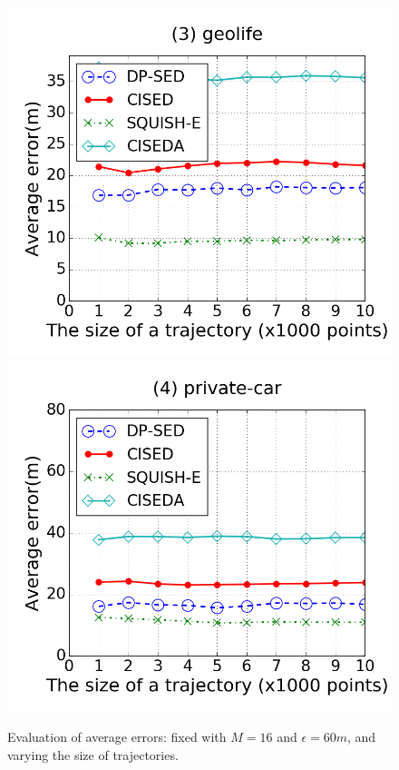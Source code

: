 \begin{figure}[tb!]
\includegraphics[scale = 0.250]{figures/Exp-error-size-geolife.png}
\includegraphics[scale = 0.250]{figures/Exp-error-size-private.png}
\vspace{-2ex}
\caption{\small Evaluation of average errors: fixed with $M=16$ and $\epsilon=60m$, and varying the size of trajectories.}
\label{fig:ae-size}
\vspace{-2ex}
\end{figure}



